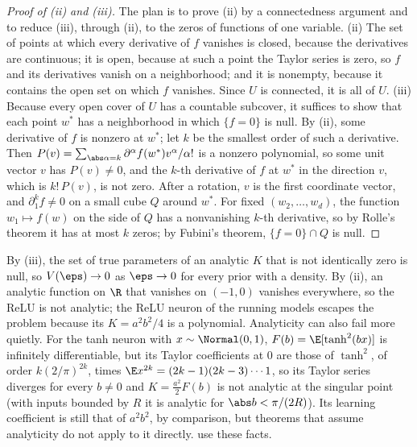 \begin{refsection}
\begin{proof}[Proof of (ii) and (iii)]
The plan is to prove (ii) by a connectedness argument and to reduce (iii), through (ii), to the zeros of functions of one variable. (ii) The set of points at which every derivative of $f$ vanishes is closed, because the derivatives are continuous; it is open, because at such a point the Taylor series is zero, so $f$ and its derivatives vanish on a neighborhood; and it is nonempty, because it contains the open set on which $f$ vanishes. Since $U$ is connected, it is all of $U$.
(iii) Because every open cover of $U$ has a countable subcover, it suffices to show that each point $w^*$ has a neighborhood in which $\{f=0\}$ is null. By (ii), some derivative of $f$ is nonzero at $w^*$; let $k$ be the smallest order of such a derivative. Then $P(v)=\sum_{\abs\alpha=k}\partial^\alpha f(w^*)v^\alpha/\alpha!$ is a nonzero polynomial, so some unit vector $v$ has $P(v)\ne0$, and the $k$-th derivative of $f$ at $w^*$ in the direction $v$, which is $k!\,P(v)$, is not zero. After a rotation, $v$ is the first coordinate vector, and $\partial_1^kf\ne0$ on a small cube $Q$ around $w^*$. For fixed $(w_2,\dots,w_d)$, the function $w_1\mapsto f(w)$ on the side of $Q$ has a nonvanishing $k$-th derivative, so by Rolle's theorem it has at most $k$ zeros; by Fubini's theorem, $\{f=0\}\cap Q$ is null.
\end{proof}

By (iii), the set of true parameters of an analytic $K$ that is not identically zero is null, so $V(\eps)\to0$ as $\eps\to0$ for every prior with a density. By (ii), an analytic function on $\R$ that vanishes on $(-1,0)$ vanishes everywhere, so the ReLU is not analytic; the ReLU neuron of the running models escapes the problem because its $K=a^2b^2/4$ is a polynomial. Analyticity can also fail more quietly. For the tanh neuron with $x\sim\Normal(0,1)$, $F(b)=\E[\tanh^2(bx)]$ is infinitely differentiable, but its Taylor coefficients at $0$ are those of $\tanh^2$, of order $k(2/\pi)^{2k}$, times $\E x^{2k}=(2k-1)(2k-3)\cdots1$, so its Taylor series diverges for every $b\ne0$ and $K=\frac{a^2}2F(b)$ is not analytic at the singular point (with inputs bounded by $R$ it is analytic for $\abs b<\pi/(2R)$). Its learning coefficient is still that of $a^2b^2$, by comparison, but theorems that assume analyticity do not apply to it directly.  use these facts.


\end{refsection}
